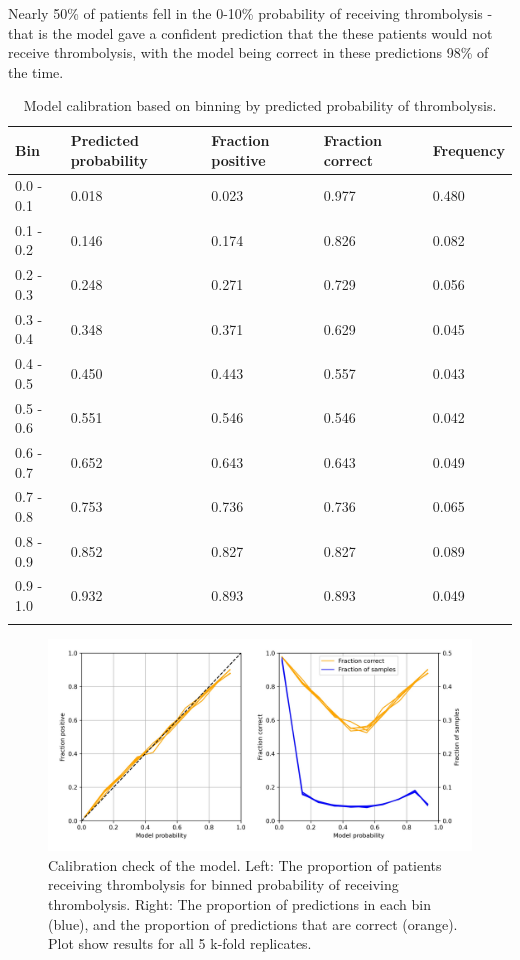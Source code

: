 Nearly 50\% of patients fell in the 0-10\% probability of receiving thrombolysis - that is the model gave a confident prediction that the these patients would not receive thrombolysis, with the model being correct in these predictions 98\% of the time.

\begin{minipage}{\textwidth}
\begin{longtable}[]{@{}lllll@{}}
\caption{Model calibration based on binning by predicted probability of thrombolysis.}\\
\toprule
Bin & Predicted probability & Fraction positive & Fraction correct &
Frequency\tabularnewline
\midrule
\endhead
0.0 - 0.1 & 0.018 & 0.023 & 0.977 & 0.480\tabularnewline
0.1 - 0.2 & 0.146 & 0.174 & 0.826 & 0.082\tabularnewline
0.2 - 0.3 & 0.248 & 0.271 & 0.729 & 0.056\tabularnewline
0.3 - 0.4 & 0.348 & 0.371 & 0.629 & 0.045\tabularnewline
0.4 - 0.5 & 0.450 & 0.443 & 0.557 & 0.043\tabularnewline
0.5 - 0.6 & 0.551 & 0.546 & 0.546 & 0.042\tabularnewline
0.6 - 0.7 & 0.652 & 0.643 & 0.643 & 0.049\tabularnewline
0.7 - 0.8 & 0.753 & 0.736 & 0.736 & 0.065\tabularnewline
0.8 - 0.9 & 0.852 & 0.827 & 0.827 & 0.089\tabularnewline
0.9 - 1.0 & 0.932 & 0.893 & 0.893 & 0.049\tabularnewline
\bottomrule
\label{tab:calibration}
\end{longtable}
\end{minipage}


\begin{figure}
\centering
\includegraphics[width=1\textwidth]{./images/02_xgb_10_features_reliability}
\caption{Calibration check of the model. Left: The proportion of patients receiving thrombolysis for binned probability of receiving thrombolysis. Right: The proportion of predictions in each bin (blue), and the proportion of predictions that are correct (orange). Plot show results for all 5 k-fold replicates.}
\label{fig:calibration}
\end{figure}


